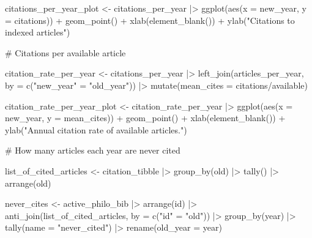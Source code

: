 \documentclass[
  10pt,
  letterpaper,
  DIV=11,
  numbers=noendperiod,
  twoside]{scrartcl}
\newenvironment{Shaded}{\begin{snugshade}}{\end{snugshade}}
\newcommand{\AttributeTok}[1]{\textcolor[rgb]{0.40,0.45,0.13}{#1}}
\newcommand{\CommentTok}[1]{\textcolor[rgb]{0.37,0.37,0.37}{#1}}
\newcommand{\FunctionTok}[1]{\textcolor[rgb]{0.28,0.35,0.67}{#1}}
\newcommand{\NormalTok}[1]{\textcolor[rgb]{0.00,0.23,0.31}{#1}}
\newcommand{\OtherTok}[1]{\textcolor[rgb]{0.00,0.23,0.31}{#1}}
\newcommand{\SpecialCharTok}[1]{\textcolor[rgb]{0.37,0.37,0.37}{#1}}
\newcommand{\StringTok}[1]{\textcolor[rgb]{0.13,0.47,0.30}{#1}}
\begin{document}
\begin{Shaded}
\begin{Highlighting}[]
\NormalTok{citations\_per\_year\_plot }\OtherTok{\textless{}{-}}\NormalTok{ citations\_per\_year }\SpecialCharTok{|\textgreater{}}
  \FunctionTok{ggplot}\NormalTok{(}\FunctionTok{aes}\NormalTok{(}\AttributeTok{x =}\NormalTok{ new\_year, }\AttributeTok{y =}\NormalTok{ citations)) }\SpecialCharTok{+}
  \FunctionTok{geom\_point}\NormalTok{() }\SpecialCharTok{+}
  \FunctionTok{xlab}\NormalTok{(}\FunctionTok{element\_blank}\NormalTok{()) }\SpecialCharTok{+}
  \FunctionTok{ylab}\NormalTok{(}\StringTok{"Citations to indexed articles"}\NormalTok{)}

\CommentTok{\# Citations per available article}

\NormalTok{citation\_rate\_per\_year }\OtherTok{\textless{}{-}}\NormalTok{ citations\_per\_year }\SpecialCharTok{|\textgreater{}}
  \FunctionTok{left\_join}\NormalTok{(articles\_per\_year, }\AttributeTok{by =} \FunctionTok{c}\NormalTok{(}\StringTok{"new\_year"} \OtherTok{=} \StringTok{"old\_year"}\NormalTok{)) }\SpecialCharTok{|\textgreater{}}
  \FunctionTok{mutate}\NormalTok{(}\AttributeTok{mean\_cites =}\NormalTok{ citations}\SpecialCharTok{/}\NormalTok{available)}

\NormalTok{citation\_rate\_per\_year\_plot }\OtherTok{\textless{}{-}}\NormalTok{ citation\_rate\_per\_year }\SpecialCharTok{|\textgreater{}}
  \FunctionTok{ggplot}\NormalTok{(}\FunctionTok{aes}\NormalTok{(}\AttributeTok{x =}\NormalTok{ new\_year, }\AttributeTok{y =}\NormalTok{ mean\_cites)) }\SpecialCharTok{+}
  \FunctionTok{geom\_point}\NormalTok{() }\SpecialCharTok{+}
  \FunctionTok{xlab}\NormalTok{(}\FunctionTok{element\_blank}\NormalTok{()) }\SpecialCharTok{+}
  \FunctionTok{ylab}\NormalTok{(}\StringTok{"Annual citation rate of available articles."}\NormalTok{)}

\CommentTok{\# How many articles each year are never cited }

\NormalTok{list\_of\_cited\_articles }\OtherTok{\textless{}{-}}\NormalTok{ citation\_tibble }\SpecialCharTok{|\textgreater{}} \FunctionTok{group\_by}\NormalTok{(old) }\SpecialCharTok{|\textgreater{}} \FunctionTok{tally}\NormalTok{() }\SpecialCharTok{|\textgreater{}} \FunctionTok{arrange}\NormalTok{(old)}

\NormalTok{never\_cites }\OtherTok{\textless{}{-}}\NormalTok{ active\_philo\_bib }\SpecialCharTok{|\textgreater{}}
  \FunctionTok{arrange}\NormalTok{(id) }\SpecialCharTok{|\textgreater{}}
  \FunctionTok{anti\_join}\NormalTok{(list\_of\_cited\_articles, }\AttributeTok{by =} \FunctionTok{c}\NormalTok{(}\StringTok{"id"} \OtherTok{=} \StringTok{"old"}\NormalTok{)) }\SpecialCharTok{|\textgreater{}}
  \FunctionTok{group\_by}\NormalTok{(year) }\SpecialCharTok{|\textgreater{}}
  \FunctionTok{tally}\NormalTok{(}\AttributeTok{name =} \StringTok{"never\_cited"}\NormalTok{) }\SpecialCharTok{|\textgreater{}}
  \FunctionTok{rename}\NormalTok{(}\AttributeTok{old\_year =}\NormalTok{ year)}


\end{Highlighting}
\end{Shaded}
\end{document}
